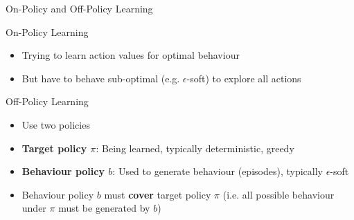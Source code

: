 \documentclass[ignorenonframetext,xcolor=x11names]{beamer}
\begin{document}
\begin{frame}[label=full]{On-Policy and Off-Policy Learning}
\begin{block}{On-Policy Learning}
\begin{itemize}
   \item Trying to learn action values for optimal behaviour
   \item But have to behave sub-optimal (e.g. $\epsilon$-soft) to explore all actions
\end{itemize}
\end{block}

\begin{block}{Off-Policy Learning}
\begin{itemize}
   \item Use two policies
   \item \textbf{Target policy $\pi$}: Being learned, typically deterministic, greedy
   \item \textbf{Behaviour policy $b$}: Used to generate behaviour (episodes), typically $\epsilon$-soft
   \item Behaviour policy $b$ must \textbf{cover} target policy $\pi$ (i.e. all possible behaviour under $\pi$ must be generated by $b$)
\end{itemize}
\end{block}
\end{frame}

\end{document}
